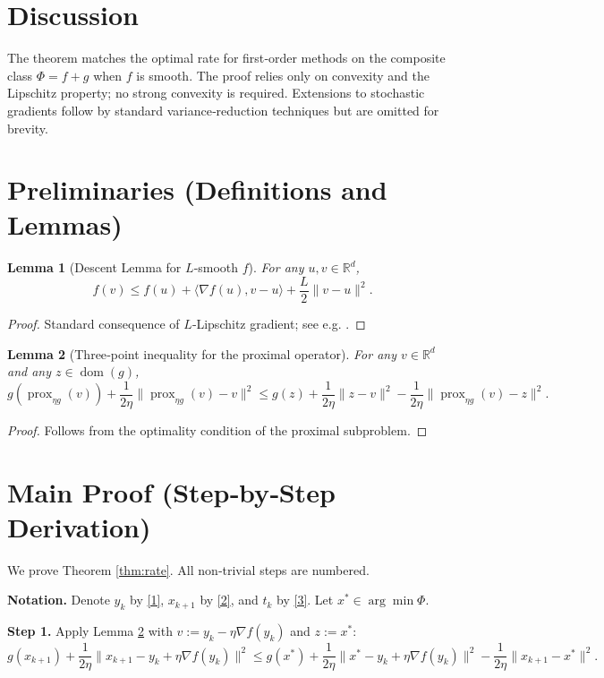 \documentclass{article}
\newtheorem{lemma}{Lemma}
\newcommand{\prox}{\operatorname{prox}}
\newcommand{\R}{\mathbb{R}}
\begin{document}
\section*{Discussion}
The theorem matches the optimal rate for first‑order methods on the composite class $\Phi=f+g$ when $f$ is smooth. The proof relies only on convexity and the Lipschitz property; no strong convexity is required. Extensions to stochastic gradients follow by standard variance‑reduction techniques but are omitted for brevity.

\newpage
\section*{Preliminaries (Definitions and Lemmas)}
\begin{lemma}[Descent Lemma for $L$‑smooth $f$]\label{lem:descent}
For any $u,v\in\R^{d}$,
\[
f(v)\le f(u)+\langle\nabla f(u),v-u\rangle+\frac{L}{2}\|v-u\|^{2}.
\]
\end{lemma}
\begin{proof}
Standard consequence of $L$‑Lipschitz gradient; see e.g. \cite{Nesterov2004}.
\end{proof}

\begin{lemma}[Three‑point inequality for the proximal operator]\label{lem:prox}
For any $v\in\R^{d}$ and any $z\in\operatorname{dom}(g)$,
\[
g(\prox_{\eta g}(v))+\frac{1}{2\eta}\bigl\|\prox_{\eta g}(v)-v\bigr\|^{2}
\le g(z)+\frac{1}{2\eta}\|z-v\|^{2}
-\frac{1}{2\eta}\bigl\|\prox_{\eta g}(v)-z\bigr\|^{2}.
\]
\end{lemma}
\begin{proof}
Follows from the optimality condition of the proximal subproblem.
\end{proof}

\section*{Main Proof (Step‑by‑Step Derivation)}
We prove Theorem \ref{thm:rate}.  All non‑trivial steps are numbered.

\medskip
\noindent\textbf{Notation.} Denote $y_{k}$ by \eqref{1}, $x_{k+1}$ by \eqref{2}, and $t_{k}$ by \eqref{3}.  Let $x^{*}\in\arg\min\Phi$.

\medskip
\noindent\textbf{Step 1.} Apply Lemma \ref{lem:prox} with $v:=y_{k}-\eta\nabla f(y_{k})$ and $z:=x^{*}$:
\[
g(x_{k+1})+\frac{1}{2\eta}\|x_{k+1}-y_{k}+\eta\nabla f(y_{k})\|^{2}
\le g(x^{*})+\frac{1}{2\eta}\|x^{*}-y_{k}+\eta\nabla f(y_{k})\|^{2}
-\frac{1}{2\eta}\|x_{k+1}-x^{*}\|^{2}. \tag{5}
\]
\end{document}

